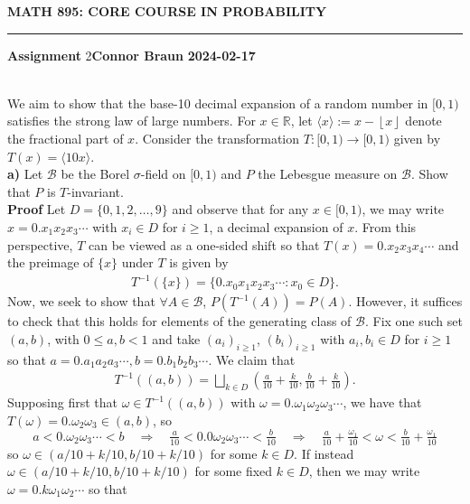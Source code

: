 \documentclass[10pt]{article}
\newcommand{\mbb}[1]{\mathbb{#1}}
\newcommand{\1}[1]{\mathbbm{1}_{#1}}
\newcommand{\mc}[1]{\mathcal{#1}}
\newcommand*{\floor}[1]{\left\lfloor#1\right\rfloor}
\begin{document}
    \begin{center}
        {\bf\large{MATH 895: CORE COURSE IN PROBABILITY}}
        \smallskip
        \hrule
        \smallskip
        {\bf Assignment} 2\hfill {\bf Connor Braun} \hfill {\bf 2024-02-17}
    \end{center}
    \\[5pt]
    We aim to show that the base-10 decimal expansion of a random number in $[0,1)$ satisfies the strong law of large numbers. For $x\in\mbb{R}$, let $\langle x\rangle:=x-\floor{x}$ denote the fractional part of $x$. Consider the transformation $T:[0,1)\rightarrow[0,1)$ given by $T(x)=\langle 10x\rangle$.\\[5pt]
    {\bf a)}\hspace{5pt} Let $\mc{B}$ be the Borel $\sigma$-field on $[0,1)$ and $P$ the Lebesgue measure on $\mc{B}$. Show that $P$ is $T$-invariant.\\[5pt]
    {\bf Proof}\hspace{5pt} Let $D=\{0,1,2,\dots,9\}$ and observe that for any $x\in[0,1)$, we may write $x=0.x_1x_2x_3\cdots$ with $x_i\in D$ for $i\geq 1$, a decimal expansion of $x$. From this perspective, $T$ can be viewed as a one-sided shift so that $T(x)=0.x_2x_3x_4\cdots$ and the preimage of $\{x\}$ under $T$ is given by
    \begin{align*}
        T^{-1}(\{x\})=\{0.x_0x_1x_2x_3\cdots:x_0\in D\}.
    \end{align*}
    Now, we seek to show that $\forall A\in\mc{B}$, $P(T^{-1}(A))=P(A)$. However, it suffices to check that this holds for elements of the generating class of $\mc{B}$. Fix one such set $(a,b)$, with $0\leq a,b<1$ and take $(a_i)_{i\geq 1}$, $(b_i)_{i\geq 1}$ with $a_i,b_i\in D$ for $i\geq 1$ so that $a=0.a_1a_2a_3\cdots,b=0.b_1b_2b_3\cdots$. We claim that
    \begin{align*}
        T^{-1}((a,b))=\bigsqcup_{k\in D}\left(\tfrac{a}{10}+\tfrac{k}{10},\tfrac{b}{10}+\tfrac{k}{10}\right).\tag{3}
    \end{align*}
    Supposing first that $\omega\in T^{-1}((a,b))$ with $\omega=0.\omega_1\omega_2\omega_3\cdots$, we have that $T(\omega)=0.\omega_2\omega_3\in(a,b)$, so
    \[a<0.\omega_2\omega_3\cdots<b\quad\Rightarrow\quad\tfrac{a}{10}<0.0\omega_2\omega_3\cdots <\tfrac{b}{10}\quad\Rightarrow\quad \tfrac{a}{10}+\tfrac{\omega_1}{10}<\omega<\tfrac{b}{10}+\tfrac{\omega_1}{10}\]
    so $\omega\in(a/10+k/10,b/10+k/10)$ for some $k\in D$. If instead $\omega\in (a/10+k/10,b/10+k/10)$ for some fixed $k\in D$, then we may write $\omega=0.k\omega_1\omega_2\cdots$ so that
\end{document}
